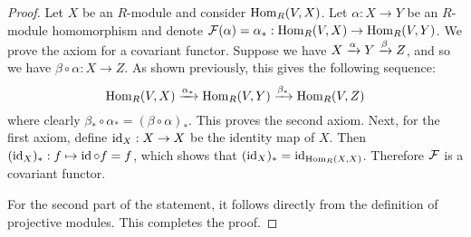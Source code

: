 \begin{proof}
    Let $X$ be an $R$-module and consider $\operatorname{Hom}_R(V,X)$. Let $\alpha:X\to Y$ be an $R$-module homomorphism and denote $\mathcal F(\alpha)= \alpha_*: \operatorname{Hom}_R(V,X)\to \operatorname{Hom}_R(V,Y)$. We prove the axiom for a covariant functor. Suppose we have $X\xrightarrow{\alpha} Y \xrightarrow{\beta} Z$, and so we have $\beta\circ \alpha: X\to Z$. As shown previously, this gives the following sequence:
    \[\operatorname{Hom}_R(V,X)\xrightarrow{\alpha_*} \operatorname{Hom}_R (V,Y)\xrightarrow{\beta_*} \operatorname{Hom}_R(V,Z)\]
    where clearly $\beta_*\circ \alpha_* = (\beta\circ \alpha)_*$. This proves the second axiom. Next, for the first axiom, define $\operatorname{id}_X:X\to X$ be the identity map of $X$. Then $(\operatorname{id}_X)_*: f\mapsto \operatorname{id}\circ f = f$, which shows that $(\operatorname{id}_X)_* = \operatorname{id}_{\operatorname{Hom}_R(X,X)}$. Therefore $\mathcal F$ is a covariant functor.

    For the second part of the statement, it follows directly from the definition of projective modules. This completes the proof.
\end{proof}